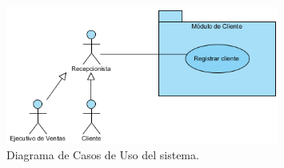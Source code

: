 

\begin{figure}[htbp!]
		\centering
			\includegraphics[width=0.8\textwidth]{images/RegistrarCliente}
		\caption{Diagrama de Casos de Uso del sistema.}
	\end{figure}

